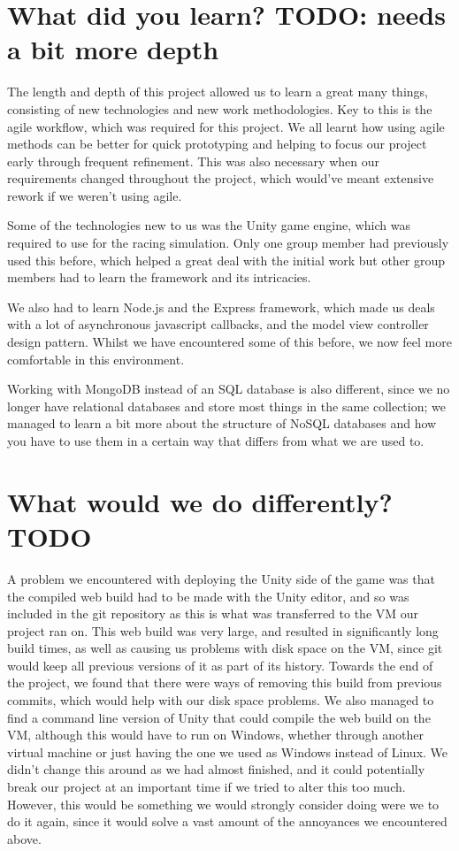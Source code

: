 \section{What did you learn? TODO: needs a bit more depth}

The length and depth of this project allowed us to learn a great many things,
consisting of new technologies and new work methodologies. Key to this is the
agile workflow, which was required for this project. We all learnt how using
agile methods can be better for quick prototyping and helping to focus our
project early through frequent refinement. This was also necessary when our
requirements changed throughout the project, which would've meant extensive
rework if we weren't using agile.

Some of the technologies new to us was the Unity game engine, which was required
to use for the racing simulation. Only one group member had previously used this
before, which helped a great deal with the initial work but other group members
had to learn the framework and its intricacies. 

We also had to learn Node.js and the Express framework, which made us deals with
a lot of asynchronous javascript callbacks, and the model view controller design
pattern. Whilst we have encountered some of this before, we now feel more
comfortable in this environment.

Working with MongoDB instead of an SQL database is also different, since we no
longer have relational databases and store most things in the same collection;
we managed to learn a bit more about the structure of NoSQL databases and how you
have to use them in a certain way that differs from what we are used to.

\section{What would we do differently? TODO}

A problem we encountered with deploying the Unity side of the game was that the
compiled web build had to be made with the Unity editor, and so was included in
the git repository as this is what was transferred to the VM our project ran on.
This web build was very large, and resulted in significantly long build times,
as well as causing us problems with disk space on the VM, since git would keep
all previous versions of it as part of its history. Towards the end of the
project, we found that there were ways of removing this build from previous
commits, which would help with our disk space problems. We also managed to find
a command line version of Unity that could compile the web build on the VM,
although this would have to run on Windows, whether through another virtual
machine or just having the one we used as Windows instead of Linux. We didn't
change this around as we had almost finished, and it could potentially break our
project at an important time if we tried to alter this too much. However, this
would be something we would strongly consider doing were we to do it again,
since it would solve a vast amount of the annoyances we encountered above.

